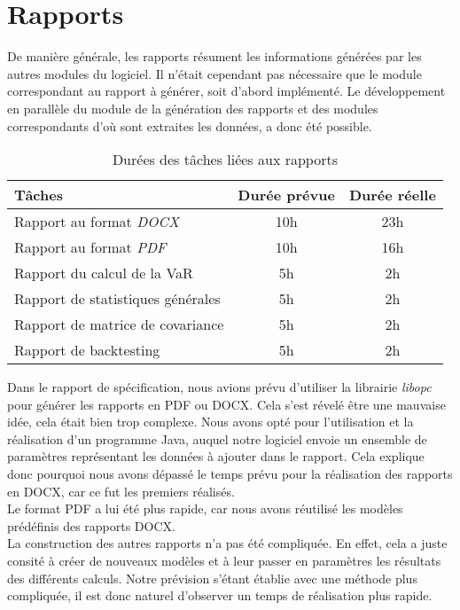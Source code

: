 \documentclass[a4paper]{report}
\begin{document}
\section{Rapports}
De manière générale, les rapports résument les informations générées par les autres modules du logiciel.
Il n'était cependant pas nécessaire que le module correspondant au rapport à générer, soit d'abord implémenté.
Le développement en parallèle du module de la génération des rapports et des modules correspondants d'où sont extraites les données, a donc été possible.

\begin{table}[H]
\centering
  \begin{tabularx}{0.8\textwidth}{| X | c | c |}
    \hline
	Tâches & Durée prévue & Durée réelle \\
    \hline
    Rapport au format \emph{DOCX} &  10h & 23h\\
    Rapport au format \emph{PDF} &  10h & 16h\\
    Rapport du calcul de la VaR & 5h & 2h\\
    Rapport de statistiques générales & 5h & 2h\\
    Rapport de matrice de covariance & 5h & 2h\\
    Rapport de backtesting & 5h & 2h\\
    \hline
  \end{tabularx}
  \caption{Durées des tâches liées aux rapports}
\end{table}

Dans le rapport de spécification, nous avions prévu d'utiliser la librairie \emph{libopc} pour générer les rapports en PDF ou DOCX.
Cela s'est révelé être une mauvaise idée, cela était bien trop complexe.
Nous avons opté pour l'utilisation et la réalisation d'un programme Java, auquel notre logiciel envoie un ensemble de paramètres représentant les données à ajouter dans le rapport.
Cela explique donc pourquoi nous avons dépassé le temps prévu pour la réalisation des rapports en DOCX, car ce fut les premiers réalisés.\\

Le format PDF a lui été plus rapide, car nous avons réutilisé les modèles prédéfinis des rapports DOCX.\\

La construction des autres rapports n'a pas été compliquée.
En effet, cela a juste consité à créer de nouveaux modèles et à leur passer en paramètres les résultats des différents calculs.
Notre prévision s'étant établie avec une méthode plus compliquée, il est donc naturel d'observer un temps de réalisation plus rapide.
\end{document}
